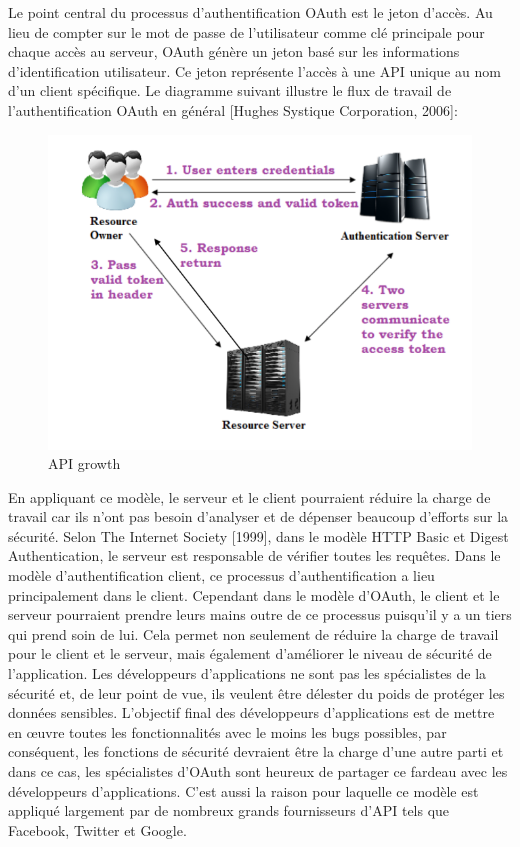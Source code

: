 Le point central du processus d'authentification OAuth est le jeton d'accès. Au lieu de compter sur le mot de passe de l'utilisateur comme clé principale pour chaque accès au serveur, OAuth génère un jeton basé sur les informations d'identification utilisateur. Ce jeton représente l'accès à une API unique au nom d'un client spécifique.
Le diagramme suivant illustre le flux de travail de l'authentification OAuth en général [Hughes Systique Corporation, 2006]:
\begin{figure}[! ht ]
			\centering
			\includegraphics[scale=.4]{./images/api_oauth_steps.png}
			\caption {API growth}
		\end{figure}
En appliquant ce modèle, le serveur et le client pourraient réduire la charge de travail car ils n'ont pas besoin d'analyser et de dépenser beaucoup d'efforts sur la sécurité. Selon The Internet Society [1999], dans le modèle HTTP Basic et Digest Authentication, le serveur est responsable de vérifier toutes les requêtes. Dans le modèle d'authentification client, ce processus d'authentification a lieu principalement dans le client. Cependant dans le modèle d'OAuth, le client et le serveur pourraient prendre leurs mains outre de ce processus puisqu'il y a un tiers qui prend soin de lui. Cela permet non seulement de réduire la charge de travail pour le client et le serveur, mais également d'améliorer le niveau de sécurité de l'application. Les développeurs d'applications ne sont pas les spécialistes de la sécurité et, de leur point de vue, ils veulent être délester du poids de protéger les données sensibles. L'objectif final des développeurs d'applications est de mettre en œuvre toutes les fonctionnalités avec le moins les bugs possibles, par conséquent, les fonctions de sécurité devraient être la charge d'une autre parti et dans ce cas, les spécialistes d'OAuth sont heureux de partager ce fardeau avec les développeurs d'applications. C'est aussi la raison pour laquelle ce modèle est appliqué largement par de nombreux grands fournisseurs d'API tels que Facebook, Twitter et Google.

